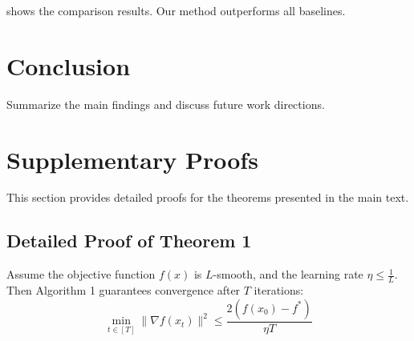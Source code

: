 \documentclass[macnew, en]{manuscript}
\begin{document}
 shows the comparison results. Our method outperforms all baselines.

\section{Conclusion}
\label{sec:conclusion}

Summarize the main findings and discuss future work directions.

\appendix

\section{Supplementary Proofs}
\label{app:proof}

This section provides detailed proofs for the theorems presented in the main text.

\subsection{Detailed Proof of Theorem 1}

\begin{theorem}
\label{thm:convergence}
    Assume the objective function $f(x)$ is $L$-smooth, and the learning rate $\eta \leq \frac{1}{L}$. Then Algorithm 1 guarantees convergence after $T$ iterations:
    \begin{equation}
        \min_{t \in [T]} \|\nabla f(x_t)\|^2 \leq \frac{2(f(x_0) - f^*)}{\eta T}
    \end{equation}
\end{theorem}
\end{document}
